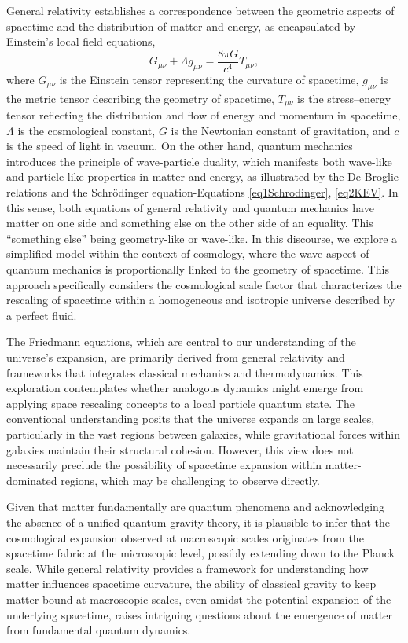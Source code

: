\documentclass{article}
\begin{document}
General relativity establishes a correspondence between the geometric aspects of spacetime and the distribution of matter and energy, as encapsulated by Einstein's local field equations,
\begin{equation}
G_{\mu\nu} + \Lambda g_{\mu\nu} = \frac{8\pi G}{c^4} T_{\mu\nu},
\end{equation}
where $G_{\mu\nu}$ is the Einstein tensor representing the curvature of spacetime, $g_{\mu\nu}$ is the metric tensor describing the geometry of spacetime, $T_{\mu\nu}$ is the stress–energy tensor reflecting the distribution and flow of energy and momentum in spacetime, $\Lambda$ is the cosmological constant, $G$ is the Newtonian constant of gravitation, and $c$ is the speed of light in vacuum. On the other hand, quantum mechanics introduces the principle of wave-particle duality, which manifests both wave-like and particle-like properties in matter and energy, as illustrated by the De Broglie relations and the Schr{\"o}dinger equation-Equations \ref{eq1Schrodinger}, \ref{eq2KEV}. In this sense, both equations of general relativity and quantum mechanics have matter on one side and something else on the other side of an equality. This ``something else'' being geometry-like or wave-like. In this discourse, we explore a simplified model within the context of cosmology, where the wave aspect of quantum mechanics is proportionally linked to the geometry of spacetime. This approach specifically considers the cosmological scale factor that characterizes the rescaling of spacetime within a homogeneous and isotropic universe described by a perfect fluid.


The Friedmann equations, which are central to our understanding of the universe's expansion, are primarily derived from general relativity and frameworks that integrates classical mechanics and thermodynamics. This exploration contemplates whether analogous dynamics might emerge from applying space rescaling concepts to a local particle quantum state. The conventional understanding posits that the universe expands on large scales, particularly in the vast regions between galaxies, while gravitational forces within galaxies maintain their structural cohesion. However, this view does not necessarily preclude the possibility of spacetime expansion within matter-dominated regions, which may be challenging to observe directly.

Given that matter fundamentally are quantum phenomena and acknowledging the absence of a unified quantum gravity theory, it is plausible to infer that the cosmological expansion observed at macroscopic scales originates from the spacetime fabric at the microscopic level, possibly extending down to the Planck scale. While general relativity provides a framework for understanding how matter influences spacetime curvature, the ability of classical gravity to keep matter bound at macroscopic scales, even amidst the potential expansion of the underlying spacetime, raises intriguing questions about the emergence of matter from fundamental quantum dynamics.
\end{document}
